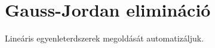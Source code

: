 \documentclass{memoir}
\begin{document}
\chapter{Gauss-Jordan elimináció}
Lineáris egyenleterdszerek megoldását automatizáljuk.
\end{document}

